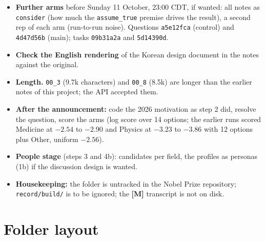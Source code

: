 \documentclass[11pt,a4paper]{article}
\newcommand{\code}[1]{\texttt{#1}}
\newcommand{\evtag}[1]{\textbf{[#1]}}
\begin{document}
\begin{itemize}
\item \textbf{Further arms} before Sunday 11 October, 23:00 CDT, if wanted: all notes as \code{consider} (how much
  the \code{assume\_true} premise drives the result), a second rep of each arm (run-to-run noise). Questions
  \code{a5e12fca} (control) and \code{4d47d56b} (main); tasks \code{09b31a2a} and \code{5d14390d}.
\item \textbf{Check the English rendering} of the Korean design document in the notes against the original.
\item \textbf{Length.} \code{00\_3} (9.7k characters) and \code{00\_8} (8.5k) are longer than the earlier notes of
  this project; the API accepted them.
\item \textbf{After the announcement:} code the 2026 motivation as step 2 did, resolve the question, score the arms
  (log score over 14 options; the earlier runs scored Medicine at $-2.54$ to $-2.90$ and Physics at $-3.23$ to
  $-3.86$ with 12 options plus Other, uniform $-2.56$).
\item \textbf{People stage} (steps 3 and 4b): candidates per field, the profiles as personas (1b) if the discussion
  design is wanted.
\item \textbf{Housekeeping:} the folder is untracked in the Nobel Prize repository; \code{record/build/} is to be
  ignored; the \evtag{M} transcript is not on disk.
\end{itemize}

\appendix

\section{Folder layout}
\end{document}
